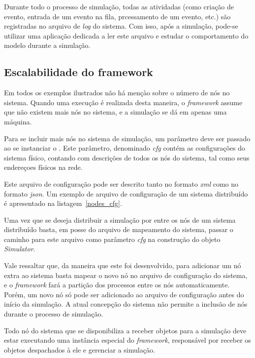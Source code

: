 Durante todo o processo de simulação, todas as atividadas (como criação de evento, entrada de um evento na fila, prcessamento de um evento, etc.) são registradas no arquivo de \textit{log} do sistema. Com isso, após a simulação, pode-se utilizar uma aplicação dedicada a ler este arquivo e estudar o comportamento do modelo durante a simulação.

\subsection{Escalabilidade do framework}

Em todos os exemplos ilustrados não há mençào sobre o número de nós no sistema. Quando uma execução é realizada desta maneira, o \textit{framework} assume que não existem mais nós no sistema, e a simulação se dá em apenas uma máquina.

Para se incluir mais nós no sistema de simulação, um parâmetro deve ser passado ao se instanciar o . Este parâmetro, denominado \textit{cfg} contém as configurações do sistema físico, contando com descrições de todos os nós do sistema, tal como seus endereçoes físicos na rede. 

Este arquivo de configuração pode ser descrito tanto no formato \textit{xml} como no formato \textit{json}. Um exemplo de arquivo de configuração de um sistema distribuído é apresentado na listagem~\ref{nodes_cfg}.



Uma vez que se deseja distribuir a simulação por entre os nós de um sistema distribuído basta, em posse do arquivo de mapeamento do sistema, passar o caminho para este arquivo como parâmetro \textit{cfg} na construção do objeto \textit{Simulator}.

Vale ressaltar que, da maneira que este  foi desenvolvido, para adicionar um nó extra ao sistema basta mapear o novo nó no arquivo de configuração do sistema, e o \textit{framework} fará a partição dos processos entre os nós automaticamente. Porém, um novo nó só pode ser adicionado ao arquivo de configuração antes do início da simulação. A atual concepção do sistema não permite a inclusão de nós durante o processo de simulação.

Todo nó do sistema que se disponibiliza a receber objetos para a simulação deve estar executando uma instância especial do \textit{framework}, responsável por receber os objetos despachados à ele e gerenciar a simulação.